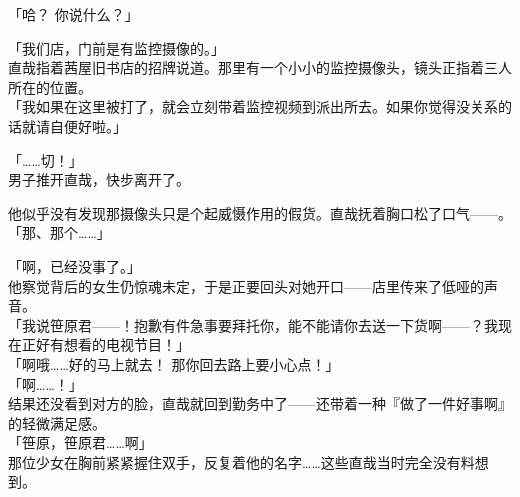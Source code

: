 「哈？ 你说什么？」

「我们店，门前是有监控摄像的。」\\

直哉指着茜屋旧书店的招牌说道。那里有一个小小的监控摄像头，镜头正指着三人所在的位置。\\

「我如果在这里被打了，就会立刻带着监控视频到派出所去。如果你觉得没关系的话就请自便好啦。」

「……切！」\\

男子推开直哉，快步离开了。

他似乎没有发现那摄像头只是个起威慑作用的假货。直哉抚着胸口松了口气——。\\

「那、那个……」

「啊，已经没事了。」\\

他察觉背后的女生仍惊魂未定，于是正要回头对她开口——店里传来了低哑的声音。\\

「我说笹原君——！抱歉有件急事要拜托你，能不能请你去送一下货啊——？我现在正好有想看的电视节目！」\\

「啊哦……好的马上就去！ 那你回去路上要小心点！」\\

「啊……！」\\

结果还没看到对方的脸，直哉就回到勤务中了——还带着一种『做了一件好事啊』的轻微满足感。\\

「笹原，笹原君……啊」\\

那位少女在胸前紧紧握住双手，反复着他的名字……这些直哉当时完全没有料想到。\\ %
